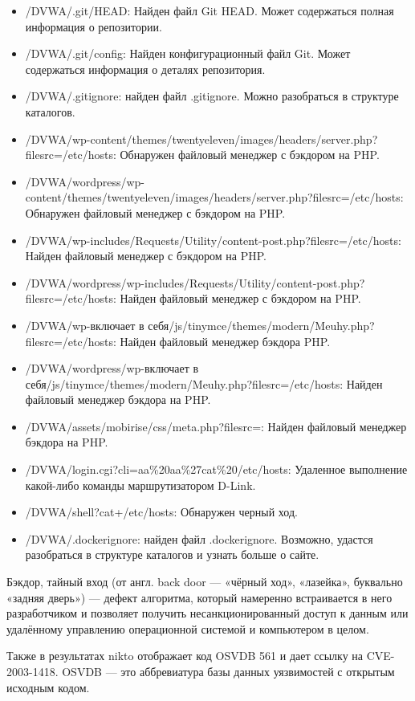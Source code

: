 \documentclass[
  english,
  russian,
  12pt,
  a4paper,
  DIV=11,
  numbers=noendperiod]{scrreprt}
\begin{document}
\begin{itemize}
  списке каталогов.
\item
  /DVWA/.git/HEAD: Найден файл Git HEAD. Может содержаться полная
  информация о репозитории.
\item
  /DVWA/.git/config: Найден конфигурационный файл Git. Может содержаться
  информация о деталях репозитория.
\item
  /DVWA/.gitignore: найден файл .gitignore. Можно разобраться в
  структуре каталогов.
\item
  /DVWA/wp-content/themes/twentyeleven/images/headers/server.php?filesrc=/etc/hosts:
  Обнаружен файловый менеджер с бэкдором на PHP.
\item
  /DVWA/wordpress/wp-content/themes/twentyeleven/images/headers/server.php?filesrc=/etc/hosts:
  Обнаружен файловый менеджер с бэкдором на PHP.
\item
  /DVWA/wp-includes/Requests/Utility/content-post.php?filesrc=/etc/hosts:
  Найден файловый менеджер с бэкдором на PHP.
\item
  /DVWA/wordpress/wp-includes/Requests/Utility/content-post.php?filesrc=/etc/hosts:
  Найден файловый менеджер с бэкдором на PHP.
\item
  /DVWA/wp-включает в
  себя/js/tinymce/themes/modern/Meuhy.php?filesrc=/etc/hosts: Найден
  файловый менеджер бэкдора PHP.
\item
  /DVWA/wordpress/wp-включает в
  себя/js/tinymce/themes/modern/Meuhy.php?filesrc=/etc/hosts: Найден
  файловый менеджер бэкдора на PHP.
\item
  /DVWA/assets/mobirise/css/meta.php?filesrc=: Найден файловый менеджер
  бэкдора на PHP.
\item
  /DVWA/login.cgi?cli=aa\%20aa\%27cat\%20/etc/hosts: Удаленное
  выполнение какой-либо команды маршрутизатором D-Link.
\item
  /DVWA/shell?cat+/etc/hosts: Обнаружен черный ход.
\item
  /DVWA/.dockerignore: найден файл .dockerignore. Возможно, удастся
  разобраться в структуре каталогов и узнать больше о сайте.
\end{itemize}

Бэкдор, тайный вход (от англ. back door --- «чёрный ход», «лазейка»,
буквально «задняя дверь») --- дефект алгоритма, который намеренно
встраивается в него разработчиком и позволяет получить
несанкционированный доступ к данным или удалённому управлению
операционной системой и компьютером в целом.

Также в результатах nikto отображает код OSVDB 561 и дает ссылку на
CVE-2003-1418. OSVDB --- это аббревиатура базы данных уязвимостей с
открытым исходным кодом.
\end{document}
